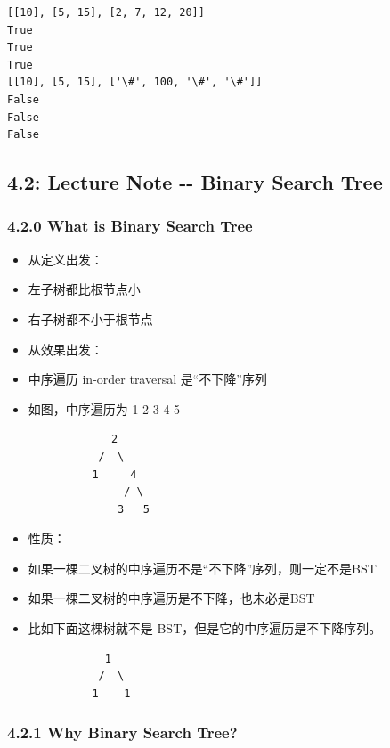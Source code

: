 \documentclass[11pt]{article}
\begin{document}
    \begin{Verbatim}[commandchars=\\\{\}]
[[10], [5, 15], [2, 7, 12, 20]]
True
True
True
[[10], [5, 15], ['\#', 100, '\#', '\#']]
False
False
False

    \end{Verbatim}

    \subsection{4.2: Lecture Note -\/- Binary Search
Tree}\label{lecture-note----binary-search-tree}

    \subsubsection{4.2.0 What is Binary Search
Tree}\label{what-is-binary-search-tree}

\begin{itemize}
\item
  从定义出发：
\item
  左子树都比根节点小
\item
  右子树都不小于根节点
\item
  从效果出发：
\item
  中序遍历 in-order traversal 是``不下降''序列
\item
  如图，中序遍历为 1 2 3 4 5

\begin{verbatim}
             2
           /  \
          1     4
               / \
              3   5             
\end{verbatim}
\item
  性质：
\item
  如果一棵二叉树的中序遍历不是``不下降''序列，则一定不是BST
\item
  如果一棵二叉树的中序遍历是不下降，也未必是BST
\item
  比如下面这棵树就不是 BST，但是它的中序遍历是不下降序列。

\begin{verbatim}
            1
           /  \
          1    1            
\end{verbatim}
\end{itemize}

    \subsubsection{4.2.1 Why Binary Search
Tree?}\label{why-binary-search-tree}
\end{document}
